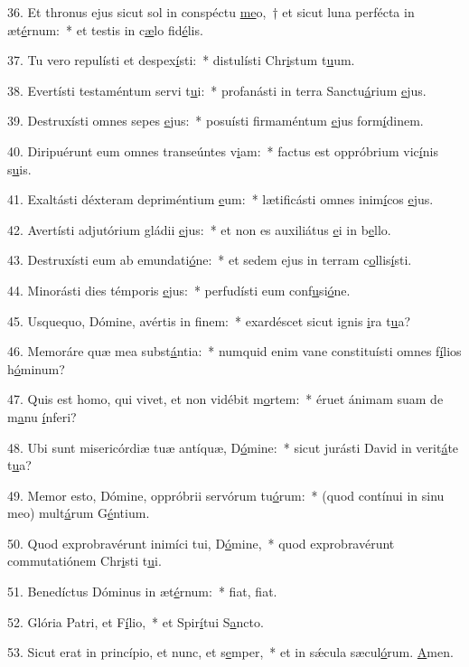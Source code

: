 36. Et thronus ejus sicut sol in conspéctu \uline{me}o,~† et sicut luna perfécta in æt\uline{é}rnum:~* et testis in c\uline{æ}lo fid\uline{é}lis.\par 
37. Tu vero repulísti et despex\uline{í}sti:~* distulísti Chr\uline{i}stum t\uline{u}um.\par 
38. Evertísti testaméntum servi t\uline{u}i:~* profanásti in terra Sanctu\uline{á}rium \uline{e}jus.\par 
39. Destruxísti omnes sepes \uline{e}jus:~* posuísti firmaméntum \uline{e}jus form\uline{í}dinem.\par 
40. Diripuérunt eum omnes transeúntes v\uline{i}am:~* factus est oppróbrium vic\uline{í}nis s\uline{u}is.\par 
41. Exaltásti déxteram depriméntium \uline{e}um:~* lætificásti omnes inim\uline{í}cos \uline{e}jus.\par 
42. Avertísti adjutórium gládii \uline{e}jus:~* et non es auxiliátus \uline{e}i in b\uline{e}llo.\par 
43. Destruxísti eum ab emundati\uline{ó}ne:~* et sedem ejus in terram c\uline{o}llis\uline{í}sti.\par 
44. Minorásti dies témporis \uline{e}jus:~* perfudísti eum conf\uline{u}si\uline{ó}ne.\par 
45. Usquequo, Dómine, avértis in f\uline{i}nem:~* exardéscet sicut ignis \uline{i}ra t\uline{u}a?\par 
46. Memoráre quæ mea subst\uline{á}ntia:~* numquid enim vane constituísti omnes f\uline{í}lios h\uline{ó}minum?\par 
47. Quis est homo, qui vivet, et non vidébit m\uline{o}rtem:~* éruet ánimam suam de m\uline{a}nu \uline{í}nferi?\par 
48. Ubi sunt misericórdiæ tuæ antíquæ, D\uline{ó}mine:~* sicut jurásti David in verit\uline{á}te t\uline{u}a?\par 
49. Memor esto, Dómine, oppróbrii servórum tu\uline{ó}rum:~* (quod contínui in sinu meo) mult\uline{á}rum G\uline{é}ntium.\par 
50. Quod exprobravérunt inimíci tui, D\uline{ó}mine,~* quod exprobravérunt commutatiónem Chr\uline{i}sti t\uline{u}i.\par 
51. Benedíctus Dóminus in æt\uline{é}rnum:~* f\uline{i}at, f\uline{i}at.\par 
52. Glória Patri, et F\uline{í}lio,~* et Spir\uline{í}tui S\uline{a}ncto.\par 
53. Sicut erat in princípio, et nunc, et s\uline{e}mper,~* et in sǽcula sæcul\uline{ó}rum. \uline{A}men.\par 
